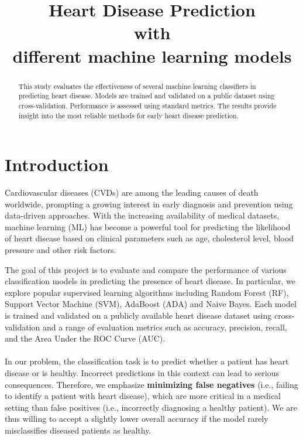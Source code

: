 \documentclass[conference]{IEEEtran}
\begin{document}
\title{Heart Disease Prediction \\with \\different machine learning models}

\author{
\and
{}
\and
{}
\and
{}
}

\maketitle

\begin{abstract}
This study evaluates the effectiveness of several machine learning classifiers in predicting heart disease. 
Models are trained and validated on a public dataset using cross-validation. 
Performance is assessed using standard metrics. 
The results provide insight into the most reliable methods for early heart disease prediction.
\end{abstract}



\begin{IEEEkeywords}

\end{IEEEkeywords}

\section{Introduction}

Cardiovascular diseases (CVDs) are among the leading causes of death worldwide, prompting a growing interest in 
early diagnosis and prevention using data-driven approaches. With the increasing availability of medical datasets, 
machine learning (ML) has become a powerful tool for predicting the likelihood of heart disease based 
on clinical parameters such as age, cholesterol level, blood pressure and other risk factors.

The goal of this project is to evaluate and compare the performance of various classification models 
in predicting the presence of heart disease. In particular, we explore popular supervised learning 
algorithms including Random Forest (RF), Support Vector Machine (SVM), AdaBoost (ADA) and Naive Bayes. Each model 
is trained and validated on a publicly available heart disease dataset using cross-validation and a 
range of evaluation metrics such as accuracy, precision, recall, and the Area Under the ROC Curve (AUC).
\\ \\
In our problem, the classification task is to predict whether a patient has heart disease or is healthy.
Incorrect predictions in this context can lead to serious consequences. Therefore, we emphasize \textbf{minimizing 
false negatives} (i.e., failing to identify a patient with heart disease), which are more critical in a 
medical setting than false positives (i.e., incorrectly diagnosing a healthy patient). 
We are thus willing to accept a slightly lower overall accuracy if the model rarely misclassifies 
diseased patients as healthy.
\end{document}
